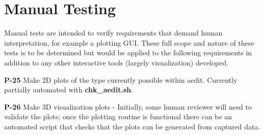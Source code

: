 %
%
\section{Manual Testing}
\label{sec:manual}

Manual tests are intended to verify requirements that demand human interpretation, for example a plotting GUI.
These full scope and nature of these tests is to be determined but would be applied to the following requirements
in addition to any other interactive tools (largely visualization) developed.

\begin{description}
  
\item{\textbf{P-25}} Make 2D plots of the type currently possible within aedit. Currently partially automated with \textbf{chk\_aedit.sh}.
\item{\textbf{P-26}} Make 3D visualization plots - Initially, some human reviewer will need to validate the plots; once the plotting routine is functional there can be an automated script that checks that the plots can be generated from captured data.

\end{description}
  




